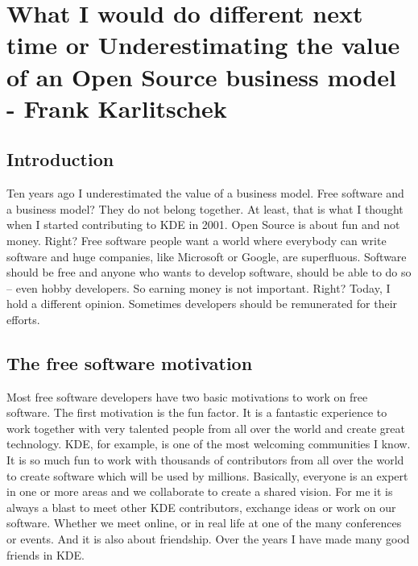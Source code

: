 \chapter{What I would do different next time or Underestimating the value of an Open Source business model - Frank Karlitschek}
\section*{Introduction}

Ten years ago I underestimated the value of a business model. Free software and a business model? They do not belong together. At least, that is what I thought when I started contributing to KDE in 2001. Open Source is about fun and not money. Right? Free software people want a world where everybody can write software and huge companies, like Microsoft or Google, are superfluous. Software should be free and anyone who wants to develop software, should be able to do so -- even hobby developers. So earning money is not important. Right? Today, I hold a different opinion. Sometimes developers should be remunerated for their efforts.  

\section*{The free software motivation}

Most free software developers have two basic motivations to work on free software. The first motivation is the fun factor. It is a fantastic experience to work together with very talented people from all over the world and create great technology. KDE, for example, is one of the most welcoming communities I know. It is so much fun to work with thousands of contributors from all over the world to create software which will be used by millions. Basically, everyone is an expert in one or more areas and we collaborate to create a shared vision. For me it is always a blast to meet other KDE contributors, exchange ideas or work on our software. Whether we meet online, or in real life at one of the many conferences or events. And it is also about friendship. Over the years I have made many good friends in KDE.

